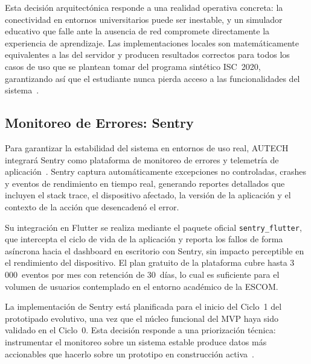 Esta decisión arquitectónica responde a una realidad operativa concreta: la conectividad en
entornos universitarios puede ser inestable, y un simulador educativo que falle ante la
ausencia de red compromete directamente la experiencia de aprendizaje. Las implementaciones
locales son matemáticamente equivalentes a las del servidor y producen resultados correctos
para todos los casos de uso que se plantean tomar del programa sintético ISC~2020, garantizando
así que el estudiante nunca pierda acceso a las funcionalidades del
sistema~\cite{hopcroft2007, supabase2024}.

\newpage
\subsection{Monitoreo de Errores: Sentry}
\label{ssec:sentry}

Para garantizar la estabilidad del sistema en entornos de uso real, AUTECH integrará Sentry
como plataforma de monitoreo de errores y telemetría de aplicación~\cite{sentry2024}. Sentry
captura automáticamente excepciones no controladas, crashes y eventos de rendimiento en tiempo
real, generando reportes detallados que incluyen el stack trace, el dispositivo afectado, la
versión de la aplicación y el contexto de la acción que desencadenó el error.

Su integración en Flutter se realiza mediante el paquete oficial \texttt{sentry\_flutter}, que
intercepta el ciclo de vida de la aplicación y reporta los fallos de forma asíncrona hacia el
dashboard en escritorio con Sentry, sin impacto perceptible en el rendimiento del dispositivo.
El plan gratuito de la plataforma cubre hasta 3\,000~eventos por mes con retención de 30~días,
lo cual es suficiente para el volumen de usuarios contemplado en el entorno académico de la
ESCOM.

La implementación de Sentry está planificada para el inicio del Ciclo~1 del prototipado
evolutivo, una vez que el núcleo funcional del MVP haya sido validado en el Ciclo~0. Esta
decisión responde a una priorización técnica: instrumentar el monitoreo sobre un sistema
estable produce datos más accionables que hacerlo sobre un prototipo en construcción
activa~\cite{sentry2024}.